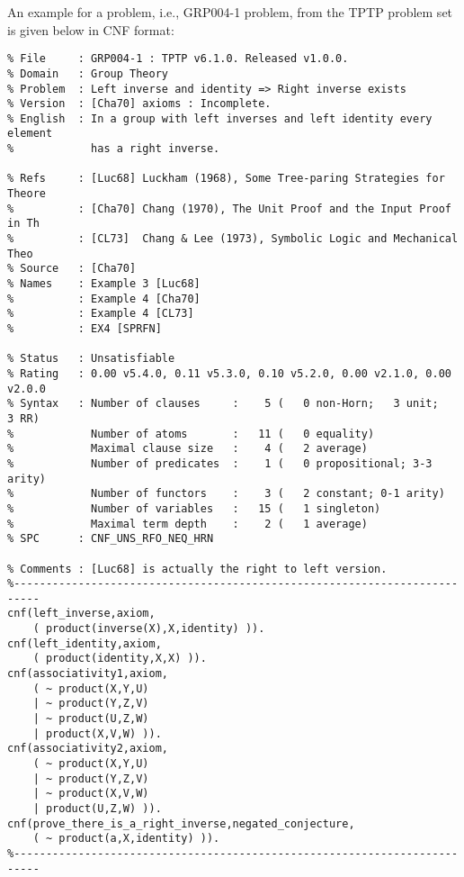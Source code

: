An example for a problem, i.e., GRP004-1 problem, from the TPTP problem set is given below in CNF format:

	\begin{lstlisting}[caption=GRP004-1.p problem,basicstyle=\footnotesize,breaklines=true,frame=single]
%--------------------------------------------------------------------------
% File     : GRP004-1 : TPTP v6.1.0. Released v1.0.0.
% Domain   : Group Theory
% Problem  : Left inverse and identity => Right inverse exists
% Version  : [Cha70] axioms : Incomplete.
% English  : In a group with left inverses and left identity every element
%            has a right inverse.

% Refs     : [Luc68] Luckham (1968), Some Tree-paring Strategies for Theore
%          : [Cha70] Chang (1970), The Unit Proof and the Input Proof in Th
%          : [CL73]  Chang & Lee (1973), Symbolic Logic and Mechanical Theo
% Source   : [Cha70]
% Names    : Example 3 [Luc68]
%          : Example 4 [Cha70]
%          : Example 4 [CL73]
%          : EX4 [SPRFN]

% Status   : Unsatisfiable
% Rating   : 0.00 v5.4.0, 0.11 v5.3.0, 0.10 v5.2.0, 0.00 v2.1.0, 0.00 v2.0.0
% Syntax   : Number of clauses     :    5 (   0 non-Horn;   3 unit;   3 RR)
%            Number of atoms       :   11 (   0 equality)
%            Maximal clause size   :    4 (   2 average)
%            Number of predicates  :    1 (   0 propositional; 3-3 arity)
%            Number of functors    :    3 (   2 constant; 0-1 arity)
%            Number of variables   :   15 (   1 singleton)
%            Maximal term depth    :    2 (   1 average)
% SPC      : CNF_UNS_RFO_NEQ_HRN

% Comments : [Luc68] is actually the right to left version.
%--------------------------------------------------------------------------
cnf(left_inverse,axiom,
    ( product(inverse(X),X,identity) )).
cnf(left_identity,axiom,
    ( product(identity,X,X) )).
cnf(associativity1,axiom,
    ( ~ product(X,Y,U)
    | ~ product(Y,Z,V)
    | ~ product(U,Z,W)
    | product(X,V,W) )).
cnf(associativity2,axiom,
    ( ~ product(X,Y,U)
    | ~ product(Y,Z,V)
    | ~ product(X,V,W)
    | product(U,Z,W) )).
cnf(prove_there_is_a_right_inverse,negated_conjecture,
    ( ~ product(a,X,identity) )).
%--------------------------------------------------------------------------
	\end{lstlisting}